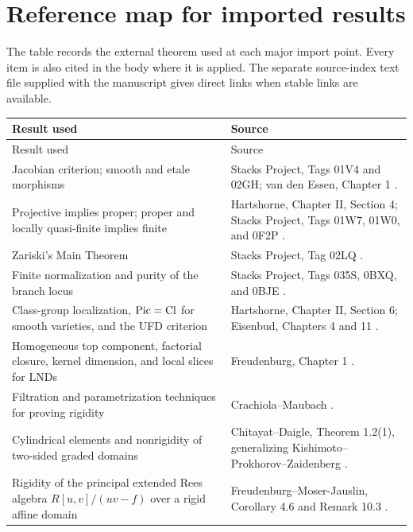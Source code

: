 \section{Reference map for imported results}\label{app:source-map}

\begin{roadmap}\label{roadmap:source-map}
The table records the external theorem used at each major import point.  Every item is also cited in the body where it is applied.  The separate source-index text file supplied with the manuscript gives direct links when stable links are available.
\end{roadmap}

\begin{longtable}{>{\raggedright\arraybackslash}p{}p{}}
\toprule
Result used & Source \\
\midrule
\endfirsthead
\toprule
Result used & Source \\
\midrule
\endhead
Jacobian criterion; smooth and etale morphisms & Stacks Project, Tags 01V4 and 02GH; van den Essen, Chapter 1 \cite{StacksProject,vanDenEssen2000}. \\
Projective implies proper; proper and locally quasi-finite implies finite & Hartshorne, Chapter II, Section 4; Stacks Project, Tags 01W7, 01W0, and 0F2P \cite{Hartshorne1977,StacksProject}. \\
Zariski's Main Theorem & Stacks Project, Tag 02LQ \cite{StacksProject}. \\
Finite normalization and purity of the branch locus & Stacks Project, Tags 035S, 0BXQ, and 0BJE \cite{StacksProject}. \\
Class-group localization, $\operatorname{Pic}=\operatorname{Cl}$ for smooth varieties, and the UFD criterion & Hartshorne, Chapter II, Section 6; Eisenbud, Chapters 4 and 11 \cite{Hartshorne1977,Eisenbud1995}. \\
Homogeneous top component, factorial closure, kernel dimension, and local slices for LNDs & Freudenburg, Chapter 1 \cite{Freudenburg2017}. \\
Filtration and parametrization techniques for proving rigidity & Crachiola--Maubach \cite{CrachiolaMaubach2013}. \\
Cylindrical elements and nonrigidity of two-sided graded domains & Chitayat--Daigle, Theorem 1.2(1), generalizing Kishimoto--Prokhorov--Zaidenberg \cite{ChitayatDaigle2024,KishimotoProkhorovZaidenberg2013}. \\
Rigidity of the principal extended Rees algebra $R[u,v]/(uv-f)$ over a rigid affine domain & Freudenburg--Moser-Jauslin, Corollary 4.6 and Remark 10.3 \cite{FreudenburgMoserJauslin2013}. \\

\end{longtable}
